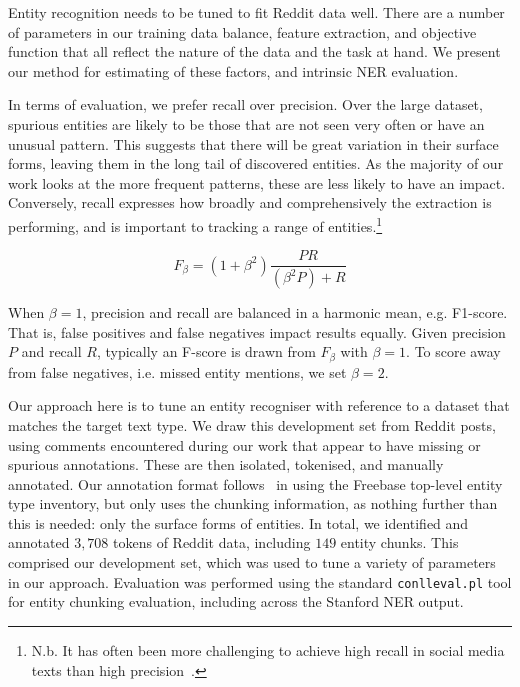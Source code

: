 \documentclass[10pt,journal,compsoc]{IEEEtran}
\begin{document}
Entity recognition needs to be tuned to fit Reddit data well.
There are a number of parameters in our training data balance, feature extraction, and objective function that all reflect the nature of the data and the task at hand.
We present our method for estimating of these factors, and intrinsic NER evaluation.

In terms of evaluation, we prefer recall over precision.
Over the large dataset, spurious entities are likely to be those that are not seen very often or have an unusual pattern.
This suggests that there will be great variation in their surface forms, leaving them in the long tail of discovered entities.
As the majority of our work looks at the more frequent patterns, these are less likely to have an impact.
Conversely, recall expresses how broadly and comprehensively the extraction is performing, and is important to tracking a range of entities.\footnote{N.b. It has often been more challenging to achieve high recall in social media texts than high precision~\cite{ritter2011named,derczynski2015analysis}.}

\begin{equation}
F_\beta = (1+\beta^2)\frac{PR}{(\beta^2 P) + R} 
\end{equation}


When $\beta=1$, precision and recall are balanced in a harmonic mean, e.g. F1-score.
That is, false positives and false negatives impact results equally.
Given precision $P$ and recall $R$, typically an F-score is drawn from $F_\beta$ with $\beta=1$.
To score away from false negatives, i.e. missed entity mentions, we set $\beta=2$.

Our approach here is to tune an entity recogniser with reference to a dataset that matches the target text type.
We draw this development set from Reddit posts, using comments encountered during our work that appear to have missing or spurious annotations.
These are then isolated, tokenised, and manually annotated.
Our annotation format follows~\cite{ritter2011named} in using the Freebase top-level entity type inventory, but only uses the chunking information, as nothing further than this is needed: only the surface forms of entities.
In total, we identified and annotated $3,708$ tokens of Reddit data, including $149$ entity chunks.
This comprised our development set, which was used to tune a variety of parameters in our approach.
Evaluation was performed using the standard {\tt conlleval.pl} tool for entity chunking evaluation, including across the Stanford NER output.
\end{document}
